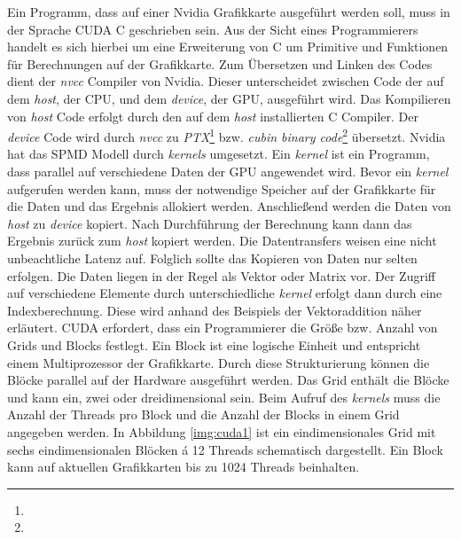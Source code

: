 Ein Programm, dass auf einer Nvidia Grafikkarte ausgeführt werden soll, muss in der Sprache CUDA C geschrieben sein. Aus der Sicht eines Programmierers handelt es sich hierbei um eine Erweiterung von C um Primitive und Funktionen für Berechnungen auf der Grafikkarte. Zum Übersetzen und Linken des Codes dient der \textit{nvcc} Compiler von Nvidia. Dieser unterscheidet zwischen Code der auf dem \textit{host}, der CPU, und dem \textit{device}, der GPU, ausgeführt wird. Das Kompilieren von \textit{host} Code erfolgt durch den auf dem \textit{host} installierten C Compiler. Der \textit{device} Code wird durch \textit{nvcc} zu \textit{PTX}\footnote{} bzw. \textit{cubin binary code}\footnote{} übersetzt.
Nvidia hat das SPMD Modell durch \textit{kernels} umgesetzt. Ein \textit{kernel} ist ein Programm, dass parallel auf verschiedene Daten der GPU angewendet wird. 
Bevor ein \textit{kernel} aufgerufen werden kann, muss der notwendige Speicher auf der Grafikkarte für die Daten und das Ergebnis allokiert werden. Anschließend werden die Daten von \textit{host} zu \textit{device} kopiert. Nach Durchführung der Berechnung kann dann das Ergebnis zurück zum \textit{host} kopiert werden. Die Datentransfers weisen eine nicht unbeachtliche Latenz auf. Folglich sollte das Kopieren von Daten nur selten erfolgen.\newline
Die Daten liegen in der Regel als Vektor oder Matrix vor. Der Zugriff auf verschiedene Elemente durch unterschiedliche \textit{kernel} erfolgt dann durch eine Indexberechnung. Diese wird anhand des Beispiels der Vektoraddition näher erläutert.\newline
CUDA erfordert, dass ein Programmierer die Größe bzw. Anzahl von Grids und Blocks festlegt. Ein Block ist eine logische Einheit und entspricht einem Multiprozessor der Grafikkarte. Durch diese Strukturierung können die Blöcke parallel auf der Hardware ausgeführt werden. Das Grid enthält die Blöcke und kann ein, zwei oder dreidimensional sein. Beim Aufruf des \textit{kernels} muss die Anzahl der Threads pro Block und die Anzahl der Blocks in einem Grid angegeben werden. In Abbildung \ref{img:cuda1} ist ein eindimensionales Grid mit sechs eindimensionalen Blöcken á 12 Threads schematisch dargestellt. Ein Block kann auf aktuellen Grafikkarten bis zu 1024 Threads beinhalten.


